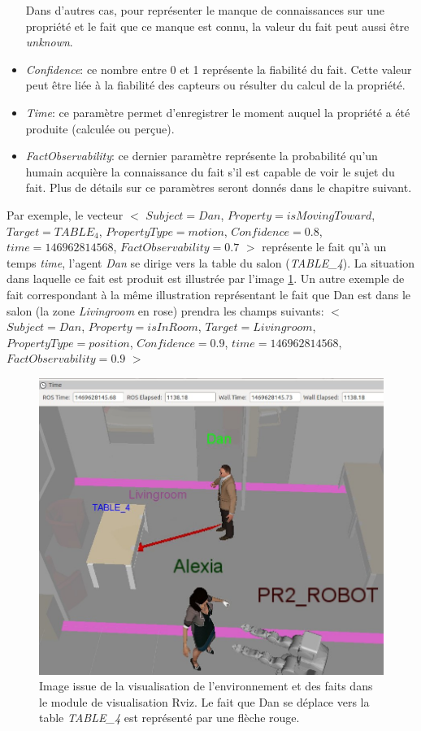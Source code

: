 \documentclass[a4paper,11pt,twoside]{StyleThese}
\begin{document}
\begin{itemize}
Dans d'autres cas, pour représenter le manque de connaissances sur une propriété et le fait que ce manque est connu, la valeur du fait peut aussi être \textit{unknown}.
\item \textit{Confidence}: ce nombre entre 0 et 1 représente la fiabilité du fait. Cette valeur peut être liée à la fiabilité des capteurs ou résulter du calcul de la propriété.
\item \textit{Time}: ce paramètre permet d'enregistrer le moment auquel la propriété a été produite (calculée ou perçue).
\item \textit{FactObservability}: ce dernier paramètre représente la probabilité qu'un humain acquière la connaissance du fait s'il est capable de voir le sujet du fait. Plus de détails sur ce paramètres seront donnés dans le chapitre suivant.
\end{itemize}

Par exemple, le vecteur 
$<$ $Subject = Dan$, $Property = isMovingToward$, $Target = TABLE_4$, $PropertyType = motion$, $Confidence = 0.8$, $time = 146962814568$, $FactObservability = 0.7$ $>$ représente le fait qu'à un temps \textit{time}, l'agent \textit{Dan} se dirige vers la table du salon (\textit{TABLE\_4}). La situation dans laquelle ce fait est produit est illustrée par l'image \ref{fig:fact}.
Un autre exemple de fait correspondant à la même illustration représentant le fait que Dan est dans le salon (la zone \textit{Livingroom} en rose) prendra les champs suivants:
$<$ $Subject = Dan$, $Property = isInRoom$, $Target = Livingroom$, $PropertyType = position$, $Confidence = 0.9$, $time = 146962814568$, $FactObservability = 0.9$ $>$


\begin{figure}[ht!]
 \centering
  \includegraphics[width=0.99\linewidth]{./img/towardTbl.jpg} 
  \caption {Image issue de la visualisation de l'environnement et des faits dans le module de visualisation Rviz. Le fait que Dan se déplace vers la table \textit{TABLE\_4} est représenté par une flèche rouge.}
  \label{fig:fact}
\end{figure}
\end{document}
